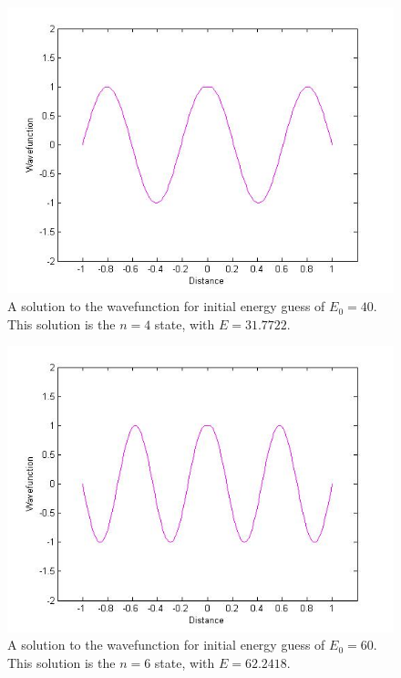 \documentclass[12pt]{article}                  %
\begin{document}
\begin{figure}[H]
\centering
\includegraphics[scale=0.45]{aogle_final_n_4.jpg}
\caption{A solution to the wavefunction for initial energy guess of $E_{0} = 40$. This solution is the $n = 4$ state, with $E = 31.7722$.}
\label{wavefunction n = 4}
\end{figure}

\begin{figure}[H]
\centering
\includegraphics[scale=0.45]{aogle_final_n_6.jpg}
\caption{A solution to the wavefunction for initial energy guess of $E_{0} = 60$. This solution is the $n = 6$ state, with $E = 62.2418$.}
\label{wavefunction n = 6}
\end{figure}
\end{document}
